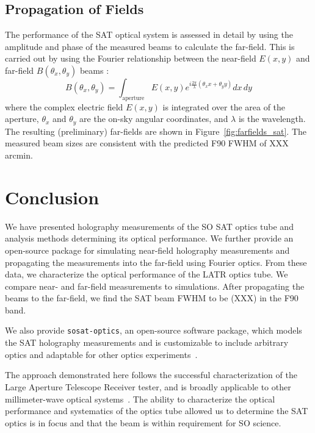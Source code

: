 \subsection{Propagation of Fields}
\label{sec:sat_prop_fields}

The performance of the SAT optical system is assessed in detail by using the amplitude and phase of the measured beams to calculate the far-field.  This is carried out by using the Fourier relationship between the near-field $E(x,y)$ and far-field $B(\theta_x,\theta_y)$ beams \cite{McIntosh2016,alma_holog}:
\begin{equation}
    B(\theta_x,\theta_y) = \int_{\text{aperture}} E(x,y) e^{ i \frac{2\pi}{\lambda} (\theta_x x + \theta_y y )} dx \, dy 
\end{equation}
where the complex electric field $E(x,y)$ is integrated over the area of the aperture, $\theta_x$ and $\theta_y$ are the on-sky angular coordinates, and $\lambda$ is the wavelength.  The resulting (preliminary) far-fields are shown in Figure~\ref{fig:farfields_sat}.  The measured beam sizes are consistent with the predicted F90 FWHM of XXX arcmin.

\section{Conclusion}
\label{sec:sat_discussion}

We have presented holography measurements of the SO SAT optics tube and analysis methods determining its optical performance.  We further provide an open-source package for simulating near-field holography measurements and propagating the measurements into the far-field using Fourier optics.  From these data, we characterize the optical performance of the LATR optics tube.  We compare near- and far-field measurements to simulations.  After propagating the beams to the far-field, we find the SAT beam FWHM to be (XXX) in the F90 band.

We also provide \verb|sosat-optics|, an open-source software package, which models the SAT holography measurements and is customizable to include arbitrary optics and adaptable for other optics experiments~\cite{sat_sim_model}.

The approach demonstrated here follows the successful characterization of the Large Aperture Telescope Receiver tester, and is broadly applicable to other millimeter-wave optical systems~\cite{chesmore2022}.  The ability to characterize the optical performance and systematics of the optics tube allowed us to determine the SAT optics is in focus and that the beam is within requirement for SO science. 

